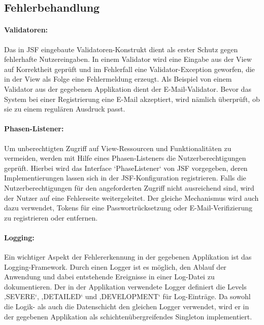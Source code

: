 \documentclass{article}
\begin{document}
\subsection{Fehlerbehandlung}

\paragraph{Validatoren:}
Das in JSF eingebaute Validatoren-Konstrukt dient als erster Schutz gegen fehlerhafte Nutzereingaben.
In einem Validator wird eine Eingabe aus der View auf Korrektheit geprüft und im Fehlerfall eine Validator-Exception geworfen, die in der View als Folge eine Fehlermeldung erzeugt.
Als Beispiel von einem Validator aus der gegebenen Applikation dient der E-Mail-Validator. Bevor das System bei einer Registrierung eine E-Mail akzeptiert, wird nämlich überprüft, ob sie zu einem regulären Ausdruck passt.

\paragraph{Phasen-Listener:}
Um unberechtigten Zugriff auf View-Ressourcen und Funktionalitäten zu vermeiden, werden mit Hilfe eines Phasen-Listeners die Nutzerberechtigungen geprüft.
Hierbei wird das Interface ‘PhaseListener‘ von JSF vorgegeben, deren Implementierungen lassen sich in der JSF-Konfiguration registrieren.
Falls die Nutzerberechtigungen für den angeforderten Zugriff nicht ausreichend sind, wird der Nutzer auf eine Fehlerseite weitergeleitet.
Der gleiche Mechanismus wird auch dazu verwendet, Tokens für eine Passwortrücksetzung oder E-Mail-Verifizierung zu registrieren oder entfernen.

\paragraph{Logging:}
Ein wichtiger Aspekt der Fehlererkennung in der gegebenen Applikation ist das Logging-Framework. Durch einen Logger ist es möglich, den Ablauf der Anwendung und dabei entstehende Ereignisse in einer Log-Datei zu dokumentieren.
Der in der Applikation verwendete Logger definiert die Levels ‚SEVERE‘, ‚DETAILED‘ und ‚DEVELOPMENT‘ für Log-Einträge.
Da sowohl die Logik- als auch die Datenschicht den gleichen Logger verwendet, wird er in der gegebenen Applikation als schichtenübergreifendes Singleton implementiert.
\end{document}

